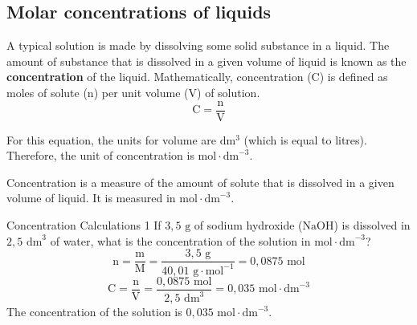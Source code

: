             \subsection*{Molar concentrations of liquids}
            \nopagebreak
      \label{m38712*id282848}A typical solution is made by dissolving some solid substance in a liquid. The amount of substance that is dissolved in a given volume of liquid is known as the \textbf{concentration} of the liquid. Mathematically, concentration (C) is defined as moles of solute (n) per unit volume (V) of solution.
      \label{m38712*id282860}\nopagebreak\noindent{}      
    \begin{equation*}
    \text{C}=\frac{\text{n}}{\text{V}}
      \end{equation*}
	\begin{figure}[H] %
\begin{center}
\end{center}
 \end{figure}
      \label{m38712*id282881}For this equation, the units for volume are $\text{dm}{}^{3}$ (which is equal to litres). Therefore, the unit of concentration is $\text{mol} \cdot {\text{dm}}^{-3}$.
	\par
\label{m38712*fhsst!!!underscore!!!id1650}
 {Concentration is a measure of the amount of solute that is dissolved in a given volume of liquid. It is measured in $\text{mol} \cdot {\text{dm}}^{-3}$.} 
 
      \noindent
      \begin{wex}{ Concentration Calculations 1 }
{
      \label{m38712*probfhsst!!!underscore!!!id1654}
      \label{m38712*id283003}If $3,5\text{ g}$ of sodium hydroxide ($\text{NaOH}$) is dissolved in $2,5 {\text{ dm}}^{3}$ of water, what is the concentration of the solution in $\text{mol}\ensuremath{\cdot}{\text{dm}}^{-3}$? 
}
{
      \label{m38712*id283067}\nopagebreak\noindent{}
    \begin{equation*}
    \text{n}=\frac{\text{m}}{\text{M}}=\frac{3,5 \text{ g}}{40,01 \text{ g} \cdot \text{mol}^{-1}} = 0,0875 \text{ mol}
      \end{equation*}
\begin{equation*}
\text{C}=\frac{\text{n}}{\text{V}}=\frac{0,0875 \text{ mol}}{2,5 \text{ dm}^{3} }=0,035 \text{ mol} \cdot \text{dm}^{-3}
\end{equation*}
The concentration of the solution is $0,035 \text{ mol} \cdot {\text{dm}}^{-3}$.
}
    \end{wex}


